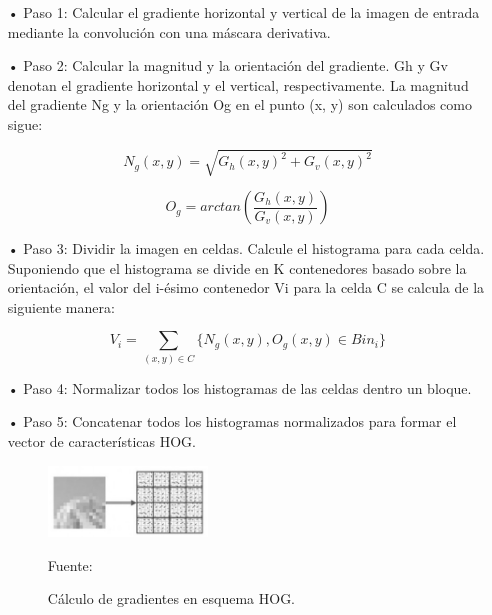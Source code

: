 \begin{itemize}
\item[•] Paso 1: Calcular el gradiente horizontal y vertical de la imagen de entrada mediante la convolución con una máscara derivativa.
\item[•] Paso 2: Calcular la magnitud y la orientación del gradiente. Gh y Gv denotan el gradiente horizontal y el vertical, respectivamente. La magnitud del gradiente Ng y la orientación Og en el punto (x, y) son calculados como sigue:

\begin{equation}
N_{g}(x,y)=\sqrt{G_{h}(x,y)^2+G_{v}(x,y)^2} 
\end{equation}

\begin{equation}
O_{g}=arctan(\frac{G_{h}(x,y)}{G_{v}(x,y)})
\end{equation}

\item[•] Paso 3: Dividir la imagen en celdas. Calcule el histograma para cada celda. Suponiendo que el histograma se divide en K contenedores basado sobre la orientación, el valor del i-ésimo contenedor Vi para la celda C se calcula de la siguiente manera:

\begin{equation}
V_{i}=\sum_{(x,y)\in C} \{ {N_g(x,y), O_g(x,y)\in Bin_i} \}
\end{equation}

\item[•] Paso 4: Normalizar todos los histogramas de las celdas dentro un bloque.
\item[•] Paso 5: Concatenar todos los histogramas normalizados para formar el vector de características HOG.

\begin{figure}[ht]
\begin{center}
\includegraphics[width=0.4\textwidth]{Imagen19}
\end{center}
\begin{center}
\vskip -0.5cm
\caption{\small{Cálculo de gradientes en esquema HOG.}}
{\small{Fuente: \cite{Fernando}}}
\end{center}
\end{figure}

\end{itemize}

